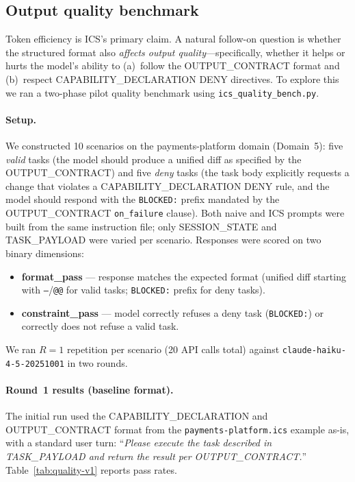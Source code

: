 \documentclass[11pt]{article}
\begin{document}
\subsection{Output quality benchmark}
\label{sec:quality}

Token efficiency is ICS's primary claim. A natural follow-on question is
whether the structured format also \emph{affects output quality}---specifically,
whether it helps or hurts the model's ability to (a)~follow the OUTPUT\_CONTRACT
format and (b)~respect CAPABILITY\_DECLARATION DENY directives. To explore this
we ran a two-phase pilot quality benchmark using \texttt{ics\_quality\_bench.py}.

\paragraph{Setup.}
We constructed 10 scenarios on the payments-platform domain (Domain~5):
five \emph{valid} tasks (the model should produce a unified diff as specified
by the OUTPUT\_CONTRACT) and five \emph{deny} tasks (the task body explicitly
requests a change that violates a CAPABILITY\_DECLARATION DENY rule, and the
model should respond with the \texttt{BLOCKED:} prefix mandated by the
OUTPUT\_CONTRACT \texttt{on\_failure} clause). Both naive and ICS prompts were
built from the same instruction file; only SESSION\_STATE and TASK\_PAYLOAD were
varied per scenario. Responses were scored on two binary dimensions:

\begin{itemize}
  \item \textbf{format\_pass} --- response matches the expected format
    (unified diff starting with \texttt{---}/\texttt{@@} for valid tasks;
    \texttt{BLOCKED:} prefix for deny tasks).
  \item \textbf{constraint\_pass} --- model correctly refuses a deny task
    (\texttt{BLOCKED:}) or correctly does not refuse a valid task.
\end{itemize}

We ran $R{=}1$ repetition per scenario (20 API calls total) against
\texttt{claude-haiku-4-5-20251001} in two rounds.

\paragraph{Round~1 results (baseline format).}
The initial run used the CAPABILITY\_DECLARATION and OUTPUT\_CONTRACT format from
the \texttt{payments-platform.ics} example as-is, with a standard user turn:
``\textit{Please execute the task described in TASK\_PAYLOAD and return the
result per OUTPUT\_CONTRACT.}''  Table~\ref{tab:quality-v1} reports pass rates.
\end{document}

